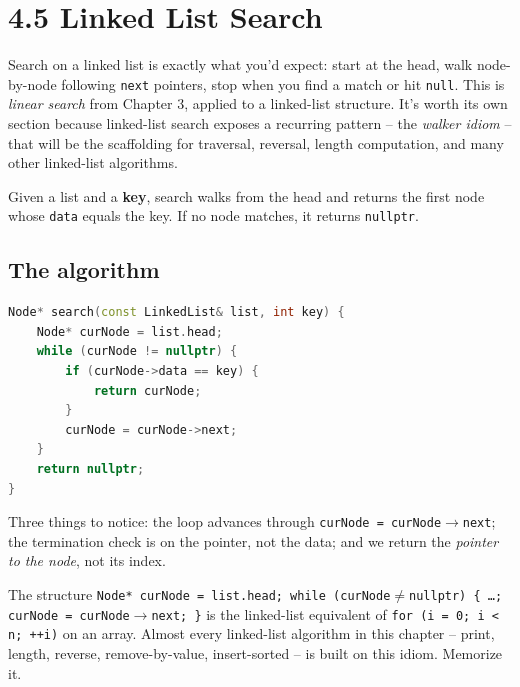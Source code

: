 \documentclass[11pt]{article}
\begin{document}
\section{4.5 Linked List Search}

Search on a linked list is exactly what you'd expect: start at the
head, walk node-by-node following \texttt{next} pointers, stop when
you find a match or hit \texttt{null}. This is \emph{linear search}
from Chapter 3, applied to a linked-list structure. It's worth its
own section because linked-list search exposes a recurring pattern
-- the \emph{walker idiom} -- that will be the scaffolding for
traversal, reversal, length computation, and many other linked-list
algorithms.

\begin{defnbox}
Given a list and a \textbf{key}, search walks from the head and
returns the first node whose \texttt{data} equals the key. If no
node matches, it returns \texttt{nullptr}.
\end{defnbox}

\subsection{The algorithm}

\begin{examplebox}
\begin{lstlisting}[basicstyle=\ttfamily\small,frame=single,language=C++]
Node* search(const LinkedList& list, int key) {
    Node* curNode = list.head;
    while (curNode != nullptr) {
        if (curNode->data == key) {
            return curNode;
        }
        curNode = curNode->next;
    }
    return nullptr;
}
\end{lstlisting}
Three things to notice: the loop advances through
\texttt{curNode = curNode$\to$next}; the termination check is on
the pointer, not the data; and we return the \emph{pointer to the
node}, not its index.
\end{examplebox}

\begin{ideabox}
The structure \texttt{Node* curNode = list.head; while
(curNode$\neq$nullptr) \{ \ldots; curNode = curNode$\to$next; \}} is
the linked-list equivalent of \texttt{for (i = 0; i < n; ++i)} on
an array. Almost every linked-list algorithm in this chapter --
print, length, reverse, remove-by-value, insert-sorted -- is built
on this idiom. Memorize it.
\end{ideabox}
\end{document}
